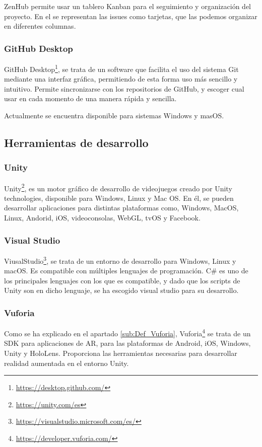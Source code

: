 ZenHub permite usar un tablero Kanban para el seguimiento y organización del proyecto. En el se representan las issues como tarjetas, que las podemos organizar en diferentes columnas.


\subsubsection{GitHub Desktop}
 GitHub Desktop\footnote{\url{https://desktop.github.com/}}, se trata de un software  que facilita el uso del sistema Git mediante una interfaz gráfica, permitiendo de esta forma uso más sencillo y intuitivo. Permite sincronizarse con los repositorios de GitHub, y escoger cual usar en cada momento de una manera  rápida y sencilla.
 
 
 Actualmente se encuentra disponible para sistemas Windows y masOS.

\subsection{Herramientas de desarrollo}

\subsubsection{Unity}
Unity\footnote{\url{https://unity.com/es}}, es un motor gráfico de desarrollo de videojuegos creado por Unity technologies, disponible para Windows, Linux y Mac OS. En él, se pueden desarrollar aplicaciones para distintas plataformas como, Windows, MacOS, Linux, Andorid, iOS, videoconsolas, WebGL, tvOS y Facebook.

\subsubsection{Visual Studio}
ViusalStudio\footnote{\url{https://visualstudio.microsoft.com/es/}}, se trata de un entorno de desarrollo para Windows, Linux y macOS. Es compatible con múltiples lenguajes de programación. C\# es uno de los principales lenguajes con los que es compatible, y dado que los scripts de Unity son en dicho lenguaje, se ha escogido visual studio para su desarrollo.


\subsubsection{Vuforia}
Como se ha explicado en el apartado \ref{sub:Def_Vuforia}, Vuforia\footnote{\url{https://developer.vuforia.com/}} se trata de un SDK para aplicaciones de AR, para las plataformas de Android, iOS, Windows, Unity y HoloLens. Proporciona las herramientas necesarias para desarrollar realidad aumentada en el entorno Unity.

